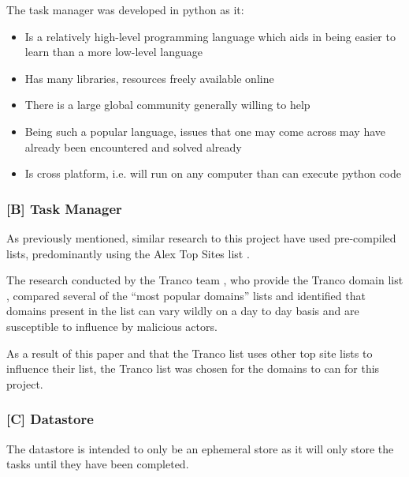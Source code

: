 \documentclass{mscreport}
\begin{document}
\noindent
The task manager was developed in python as it:

\begin{itemize}
	\setlength\itemsep{0.1em}
    \item Is a relatively high-level programming language which aids in being easier to learn than a more low-level language
    \item Has many libraries, resources freely available online
    \item There is a large global community generally willing to help
    \item Being such a popular language, issues that one may come across may have already been encountered and solved already
    \item Is cross platform, i.e. will run on any computer than can execute python code
\end{itemize}

\subsubsection{[B] Task Manager}

As previously mentioned, similar research to this project have used pre-compiled lists, predominantly using the Alex Top Sites list \cite{Buchanan2018-xz,Chen2016-dl,Kumar2017-qw,Patil2017-bg,Ying2016-ag,Michael2015-hn,Van_Goethem2014-ao,Holz2020-ha,Poteat2021-zr}.

\vspace{0.3cm} \noindent
The research conducted by the Tranco team \cite{Le_Pochat2018-ql}, who provide the Tranco domain list \cite{noauthor_undated-mt}, compared several of the ``most popular domains'' lists and identified that domains present in the list can vary wildly on a day to day basis and are susceptible to influence by malicious actors.

\vspace{0.3cm} \noindent
As a result of this paper and that the Tranco list uses other top site lists to influence their list, the Tranco list \cite{noauthor_undated-mt} was chosen for the domains to can for this project.

\subsubsection{[C] Datastore}

The datastore is intended to only be an ephemeral store as it will only store the tasks until they have been completed.
\end{document}
